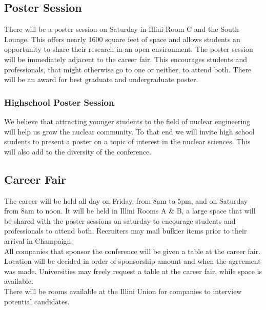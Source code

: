 \subsection{Poster Session}
There will be a poster session on Saturday in Illini Room C and the South Lounge. This offers nearly 1600 square feet of space and allows students an opportunity to share their research in an open environment. The poster session will be immediately adjacent to the career fair. This encourages students and professionals, that might otherwise go to one or neither, to attend both. There will be an award for best graduate and undergraduate poster.
\subsubsection{Highschool Poster Session}
We believe that attracting younger students to the field of nuclear engineering will help us grow the nuclear community. To that end we will invite high school students to present a poster on a topic of interest in the nuclear sciences. This will also add to the diversity of the conference.

\subsection{Career Fair}
The career will be held all day on Friday, from 8am to 5pm, and on Saturday from 8am to noon. It will be held in Illini Rooms A \& B, a large space that will be shared with the poster sessions on saturday to encourage students and professionals to attend both. Recruiters may mail bulkier items prior to their arrival in Champaign.\\ 

All companies that sponsor the conference will be given a table at the career fair. Location will be decided in order of sponsorship amount and when the agreement was made. Universities may freely request a table at the career fair, while space is available.\\

There will be rooms available at the Illini Union for companies to interview potential candidates. 


